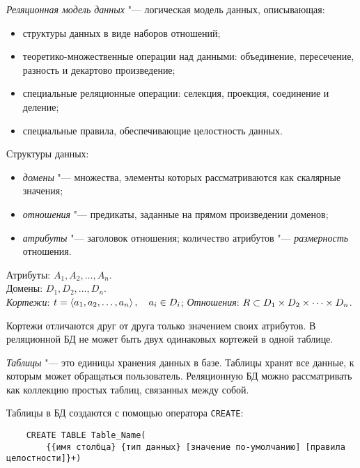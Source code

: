 \begin{definition}
	\emph{Реляционная модель данных} "--- логическая модель данных, описывающая:
	\begin{itemize}
		\item структуры данных в виде наборов отношений;
		\item теоретико-множественные операции над данными: объединение, пересечение, разность и декартово произведение;
		\item специальные реляционные операции: селекция, проекция, соединение и деление;
		\item специальные правила, обеспечивающие целостность данных.
	\end{itemize}
\end{definition}

Структуры данных:
\begin{itemize}
	\item \emph{домены} "--- множества, элементы которых рассматриваются как скалярные значения;
	\item \emph{отношения} "--- предикаты, заданные на прямом произведении доменов;
	\item \emph{атрибуты} "--- заголовок отношения; количество атрибутов "--- \emph{размерность} отношения.
\end{itemize}

Атрибуты: $ A_1, A_2, \dots, A_n $. \\
Домены: $ D_1, D_2, \dots, D_n $. \\
\emph{Кортежи}: $ t = \Braket{a_1, a_2, \dots, a_n}, \quad a_i \in D_i $;
\emph{Отношения}: $ R \subset D_1 \times D_2 \times \dots \times D_n $.

\begin{remark}
	Кортежи отличаются друг от друга только значением своих атрибутов.
	В реляционной БД не может быть двух одинаковых кортежей в одной таблице.
\end{remark}

\begin{definition}
	\emph{Таблицы} "--- это единицы хранения данных в базе.
	Таблицы хранят все данные, к которым может обращаться пользователь.
	Реляционную БД можно рассматривать как коллекцию простых таблиц, связанных между собой.
\end{definition}

Таблицы в БД создаются с помощью оператора \texttt{CREATE}:
\begin{verbatim}
	CREATE TABLE Table_Name(
		{{имя столбца} {тип данных} [значение по-умолчанию] [правила целостности]}+)
\end{verbatim}

